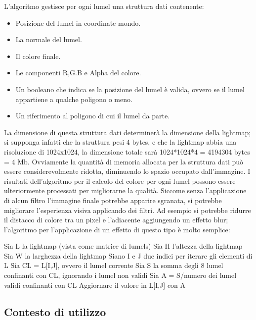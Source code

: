 L’algoritmo gestisce per ogni lumel una struttura dati contenente:
\begin{itemize}
\item Posizione del lumel in coordinate mondo.
\item La normale del lumel.
\item Il colore finale.
\item Le componenti R,G.B e Alpha del colore.
\item Un booleano che indica se la posizione del lumel è valida, ovvero se il lumel appartiene a qualche poligono o meno.
\item Un riferimento al poligono di cui il lumel da parte. 
\end{itemize}
La dimensione di questa struttura dati determinerà la dimensione della lightmap; si supponga infatti che la struttura pesi 4 bytes, e che la lightmap abbia una risoluzione di 1024x1024, la dimensione totale sarà 1024*1024*4 = 4194304 bytes = 4 Mb. Ovviamente la quantità di memoria allocata per la struttura dati può essere considerevolmente ridotta, diminuendo lo spazio occupato dall’immagine.
I risultati dell’algoritmo per il calcolo del colore per ogni lumel possono essere ulteriormente processati per migliorarne la qualità.
Siccome senza l’applicazione di alcun filtro l’immagine finale potrebbe apparire sgranata, si potrebbe migliorare l’esperienza visiva applicando dei filtri.
Ad esempio si potrebbe ridurre il distacco di colore tra un pixel e l’adiacente aggiungendo un effetto blur; l’algoritmo per l’applicazione di un effetto di questo tipo è molto semplice:
\begin{algorithm}[H]
Sia L la lightmap (vista come matrice di lumels)\;
Sia H l'altezza della lightmap\;
Sia W la larghezza della lightmap\;
Siano I e J due indici per iterare gli elementi di L\;
  {
   { 
    Sia CL = L[I,J], ovvero il lumel corrente\;
    Sia S la somma degli 8 lumel confinanti con CL, ignorando i lumel non validi\;
    Sia A = S/numero dei lumel validi confinanti con CL\;
    Aggiornare il valore in L[I,J] con A\;
   }
  }
\end{algorithm}

\subsection{Contesto di utilizzo}
\label{sec:chapter_stato_arte_contex_use}

